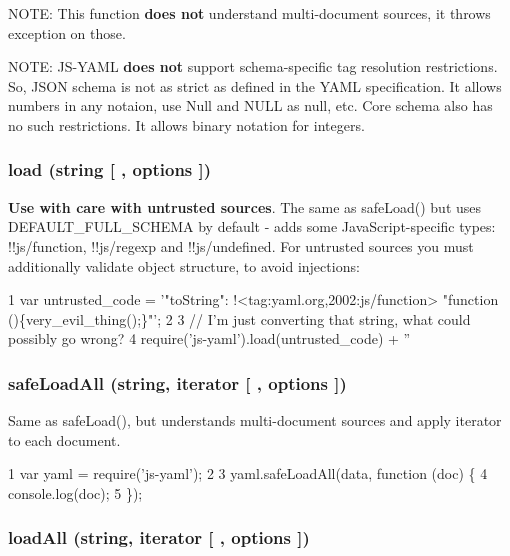 N\+O\+T\+E\+: This function {\bfseries does not} understand multi-\/document sources, it throws exception on those.

N\+O\+T\+E\+: J\+S-\/\+Y\+A\+M\+L {\bfseries does not} support schema-\/specific tag resolution restrictions. So, J\+S\+O\+N schema is not as strict as defined in the Y\+A\+M\+L specification. It allows numbers in any notaion, use {\ttfamily Null} and {\ttfamily N\+U\+L\+L} as {\ttfamily null}, etc. Core schema also has no such restrictions. It allows binary notation for integers.

\subsubsection*{load (string \mbox{[} , options \mbox{]})}

{\bfseries Use with care with untrusted sources}. The same as {\ttfamily safe\+Load()} but uses {\ttfamily D\+E\+F\+A\+U\+L\+T\+\_\+\+F\+U\+L\+L\+\_\+\+S\+C\+H\+E\+M\+A} by default -\/ adds some Java\+Script-\/specific types\+: {\ttfamily !!js/function}, {\ttfamily !!js/regexp} and {\ttfamily !!js/undefined}. For untrusted sources you must additionally validate object structure, to avoid injections\+:


\begin{DoxyCode}
1 var untrusted\_code = '"toString": !<tag:yaml.org,2002:js/function> "function ()\{very\_evil\_thing();\}"';
2 
3 // I'm just converting that string, what could possibly go wrong?
4 require('js-yaml').load(untrusted\_code) + ''
\end{DoxyCode}


\subsubsection*{safe\+Load\+All (string, iterator \mbox{[} , options \mbox{]})}

Same as {\ttfamily safe\+Load()}, but understands multi-\/document sources and apply {\ttfamily iterator} to each document.


\begin{DoxyCode}
1 var yaml = require('js-yaml');
2 
3 yaml.safeLoadAll(data, function (doc) \{
4   console.log(doc);
5 \});
\end{DoxyCode}


\subsubsection*{load\+All (string, iterator \mbox{[} , options \mbox{]})}

